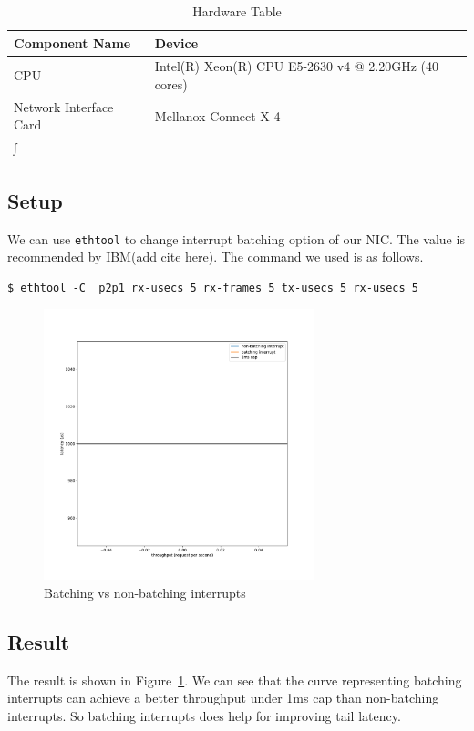 \documentclass[bsc,frontabs,twoside,singlespacing,parskip,deptreport]{infthesis}     %
\begin{document}
\begin{table}
	\begin{tabular}{ |p{6cm}||p{6cm}|  }
	 \hline
	 Component Name & Device \\
	 \hline
	CPU & Intel(R) Xeon(R) CPU E5-2630 v4 @ 2.20GHz (40 cores) \\
	 \hline
	Network Interface Card & Mellanox Connect-X 4 \\
	 \hline∫
	\end{tabular}
	\caption{Hardware Table}
	\label{tab:hardware}	
\end{table}
\subsection{Setup}
We can use \texttt{ethtool} to change interrupt batching option of our NIC. The value is recommended by IBM(add cite here). The command we used is as follows.

\begin{verbatim}
$ ethtool -C  p2p1 rx-usecs 5 rx-frames 5 tx-usecs 5 rx-usecs 5
\end{verbatim}

\begin{figure}[h]
	\centering
	\includegraphics[width=0.7\textwidth,height=0.7\textheight,keepaspectratio]{figure/multithreading.pdf}
	\caption{Batching vs non-batching interrupts}
	\label{fig:batching}
\end{figure}


\subsection{Result}
The result is shown in Figure~\ref{fig:batching}. We can see that the curve representing batching interrupts can achieve a better throughput under 1ms cap than non-batching interrupts. So batching interrupts does help for improving tail latency.
\end{document}
